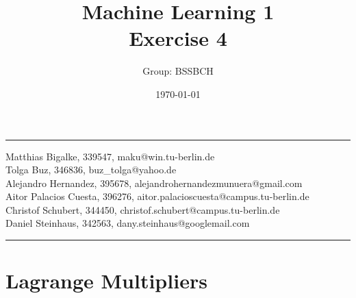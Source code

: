 \documentclass{article}
\title{Machine Learning 1 \\ Exercise 4} %
\author{Group: BSSBCH} %
\date{\today} %
\begin{document}
\maketitle %
\noindent\rule[0.5ex]{\linewidth}{1pt}
Matthias Bigalke, 339547, maku@win.tu-berlin.de \\
Tolga Buz, 346836, buz\_tolga@yahoo.de \\
Alejandro Hernandez, 395678, alejandrohernandezmunuera@gmail.com \\
Aitor Palacios Cuesta, 396276, aitor.palacioscuesta@campus.tu-berlin.de \\
Christof Schubert, 344450, christof.schubert@campus.tu-berlin.de \\
Daniel Steinhaus, 342563, dany.steinhaus@googlemail.com\\
\noindent\rule[0.5ex]{\linewidth}{1pt}


\section{Lagrange Multipliers}
\end{document}
